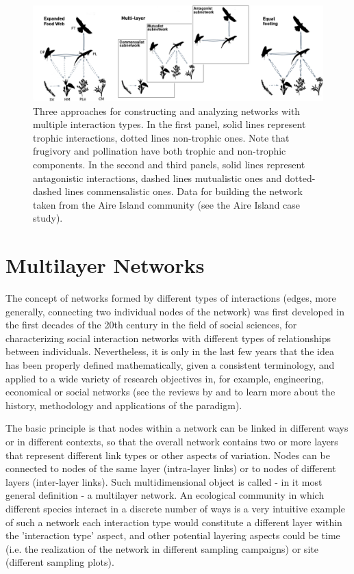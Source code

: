 \begin{figure}[ht]
\centering
\includegraphics[width=\textwidth]{./Figures/chapter02/Fig_1.png}
\caption[Three approaches for multiple interactions networks]{\color{Gray} Three approaches for constructing and analyzing networks with multiple interaction types. In the first panel, solid lines represent trophic interactions, dotted lines non-trophic ones. Note that frugivory and pollination have both trophic and non-trophic components. In the second and third panels, solid lines represent antagonistic interactions, dashed lines mutualistic ones and dotted-dashed lines commensalistic ones. Data for building the network taken from the Aire Island community (see the Aire Island case study).}
\label{fig:fig2.1}
\end{figure}

\section*{Multilayer Networks}
The concept of networks formed by different types of interactions (edges, more generally, connecting two individual nodes of the network) was first developed in the first decades of the 20th century in the field of social sciences, for characterizing social interaction networks with different types of relationships between individuals. Nevertheless, it is only in the last few years that the idea has been properly defined mathematically, given a consistent terminology, and applied to a wide variety of research objectives in, for example, engineering, economical or social networks (see the reviews by \citealt{Boccaletti2014} and \citealt{Kivela2014} to learn more about the history, methodology and applications of the paradigm).

The basic principle is that nodes within a network can be linked in different ways or in different contexts, so that the overall network contains two or more layers that represent different link types or other aspects of variation. Nodes can be connected to nodes of the same layer (intra-layer links) or to nodes of different layers (inter-layer links). Such multidimensional object is called - in it most general definition - a multilayer network. An ecological community in which different species interact in a discrete number of ways is a very intuitive example of such a network \cite{Pilosof2017} each interaction type would constitute a different layer within the {}'interaction type{}' aspect, and other potential layering aspects could be time (i.e. the realization of the network in different sampling campaigns) or site (different sampling plots).

